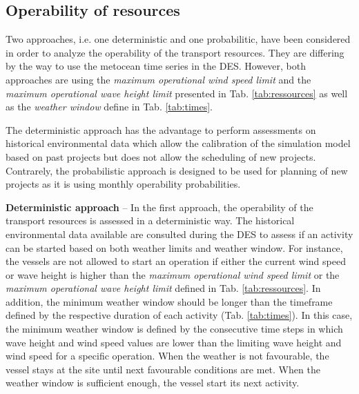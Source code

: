 \subsection{Operability of resources}
Two approaches, i.e. one deterministic and one probabilitic, have been considered in order to analyze the operability of the transport resources. They are differing by the way to use the metocean time series in the DES. However, both approaches are using the \textit{maximum operational wind speed limit} and the \textit{maximum operational wave height limit} presented in Tab. \ref{tab:ressources} as well as the \textit{weather window} define in Tab. \ref{tab:times}.

The deterministic approach has the advantage to perform assessments on historical environmental data which allow the calibration of the simulation model based on past projects but does not allow the scheduling of new projects. Contrarely, the probabilistic approach is designed to be used for planning of new projects as it is using monthly operability probabilities. %

\textbf{Deterministic approach} -- In the first approach, the operability of the transport resources is assessed in a deterministic way. The historical environmental data available are consulted during the DES to assess if an activity can be started based on both weather limits and weather window. For instance, the vessels are not allowed to start an operation if either the current wind speed or wave height is higher than the \textit{maximum operational wind speed limit} or the \textit{maximum operational wave height limit} defined in Tab. \ref{tab:ressources}. In addition, the minimum weather window should be longer than the timeframe defined by the respective duration of each activity (Tab. \ref{tab:times}). In this case, the minimum weather window is defined by the consecutive time steps in which wave height and wind speed values are lower than the limiting wave height and wind speed for a specific operation. When the weather is not favourable, the vessel stays at the site until next favourable conditions are met. When the weather window is sufficient enough, the vessel start its next activity. 

